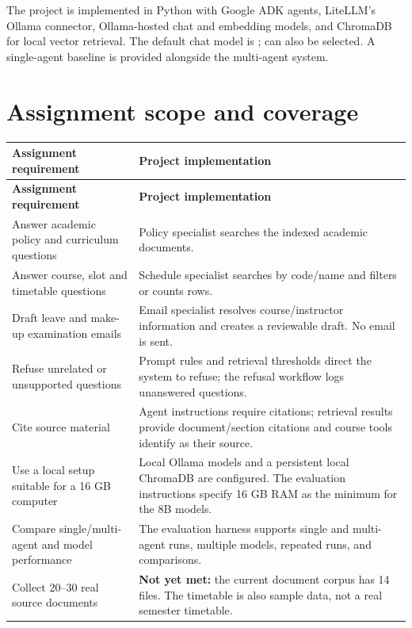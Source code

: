 \documentclass[11pt,a4paper]{article}
\newcommand{\code}[1]{\texttt{\detokenize{#1}}}
\begin{document}
The project is implemented in Python with Google ADK agents, LiteLLM's Ollama connector, Ollama-hosted chat and embedding models, and ChromaDB for local vector retrieval. The default chat model is \code{qwen3:8b}; \code{llama3.1:8b} can also be selected. A single-agent baseline is provided alongside the multi-agent system.

\section{Assignment scope and coverage}

\begin{longtable}{p{}p{}}
\toprule
\textbf{Assignment requirement} & \textbf{Project implementation}\\
\midrule
\endfirsthead
\toprule
\textbf{Assignment requirement} & \textbf{Project implementation}\\
\midrule
\endhead
Answer academic policy and curriculum questions & Policy specialist searches the indexed academic documents.\\
Answer course, slot and timetable questions & Schedule specialist searches \code{courses.csv} by code/name and filters or counts rows.\\
Draft leave and make-up examination emails & Email specialist resolves course/instructor information and creates a reviewable draft. No email is sent.\\
Refuse unrelated or unsupported questions & Prompt rules and retrieval thresholds direct the system to refuse; the refusal workflow logs unanswered questions.\\
Cite source material & Agent instructions require citations; retrieval results provide document/section citations and course tools identify \code{courses.csv} as their source.\\
Use a local setup suitable for a 16 GB computer & Local Ollama models and a persistent local ChromaDB are configured. The evaluation instructions specify 16 GB RAM as the minimum for the 8B models.\\
Compare single/multi-agent and model performance & The evaluation harness supports single and multi-agent runs, multiple models, repeated runs, and comparisons.\\
Collect 20--30 real source documents & \textbf{Not yet met:} the current document corpus has 14 files. The timetable is also sample data, not a real semester timetable.\\
\bottomrule
\end{longtable}
\end{document}
